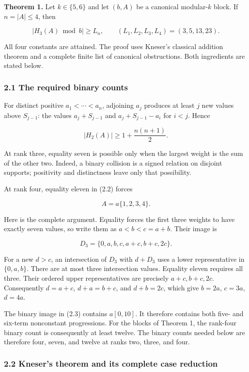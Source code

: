 \textbf{Theorem 1.} Let \(k\in\{5,6\}\) and let \((b,A)\) be a canonical modular-\(k\) block. If \(n=|A|\le4\), then

\[
\boxed{|H_3(A)\bmod b|\ge L_n,\qquad
(L_1,L_2,L_3,L_4)=(3,5,13,23).}
\tag{2.1}
\]

All four constants are attained. The proof uses Kneser's classical addition theorem and a complete finite list of canonical obstructions. Both ingredients are stated below.

\subsubsection{2.1 The required binary counts}\label{eporig:the-required-binary-counts}

For distinct positive \(a_1<\cdots<a_n\), adjoining \(a_j\) produces at least \(j\) new values above \(S_{j-1}\): the values \(a_j+S_{j-1}\) and \(a_j+S_{j-1}-a_i\) for \(i<j\). Hence

\[
|H_2(A)|\ge1+\frac{n(n+1)}2.
\tag{2.2}
\]

At rank three, equality seven is possible only when the largest weight is the sum of the other two. Indeed, a binary collision is a signed relation on disjoint supports; positivity and distinctness leave only that possibility.

At rank four, equality eleven in (2.2) forces

\[
A=a\{1,2,3,4\}.
\tag{2.3}
\]

Here is the complete argument. Equality forces the first three weights to have exactly seven values, so write them as \(a<b<c=a+b\). Their image is

\[
D_3=\{0,a,b,c,a+c,b+c,2c\}.
\]

For a new \(d>c\), an intersection of \(D_3\) with \(d+D_3\) uses a lower representative in \(\{0,a,b\}\). There are at most three intersection values. Equality eleven requires all three. Their ordered upper representatives are precisely \(a+c,b+c,2c\). Consequently \(d=a+c\), \(d+a=b+c\), and \(d+b=2c\), which give \(b=2a\), \(c=3a\), \(d=4a\).

The binary image in (2.3) contains \(a[0,10]\). It therefore contains both five- and six-term nonconstant progressions. For the blocks of Theorem 1, the rank-four binary count is consequently at least twelve. The binary counts needed below are therefore four, seven, and twelve at ranks two, three, and four.

\subsubsection{2.2 Kneser's theorem and its complete case reduction}\label{eporig:knesers-theorem-and-its-complete-case-reduction}

